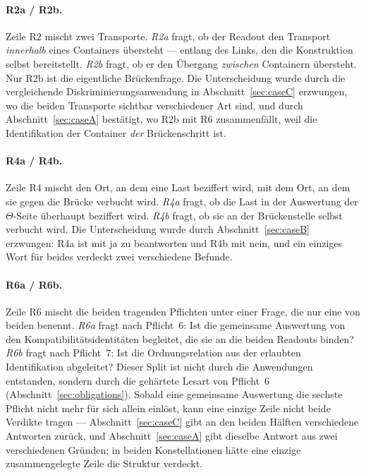 \documentclass[11pt,a4paper]{article}
\theoremstyle{definition}
\begin{document}
\paragraph{R2a / R2b.} Zeile R2 mischt zwei Transporte. \emph{R2a} fragt, ob der
Readout den Transport \emph{innerhalb} eines Containers übersteht --- entlang des
Links, den die Konstruktion selbst bereitstellt. \emph{R2b} fragt, ob er den
Übergang \emph{zwischen} Containern übersteht. Nur R2b ist die eigentliche
Brückenfrage. Die Unterscheidung wurde durch die vergleichende
Diskriminierungsanwendung in
Abschnitt~\ref{sec:caseC} erzwungen, wo die beiden Transporte sichtbar
verschiedener Art sind, und durch Abschnitt~\ref{sec:caseA} bestätigt, wo R2b mit
R6 zusammenfällt, weil die Identifikation der Container \emph{der} Brückenschritt
ist.

\paragraph{R4a / R4b.} Zeile R4 mischt den Ort, an dem eine Last beziffert wird,
mit dem Ort, an dem sie gegen die Brücke verbucht wird. \emph{R4a} fragt, ob die
Last in der Auswertung der $\Theta$-Seite überhaupt beziffert wird. \emph{R4b}
fragt, ob sie an der Brückenstelle selbst verbucht wird. Die Unterscheidung wurde
durch Abschnitt~\ref{sec:caseB} erzwungen: R4a ist mit ja zu beantworten und R4b
mit nein, und ein einziges Wort für beides verdeckt zwei verschiedene Befunde.

\paragraph{R6a / R6b.} Zeile R6 mischt die beiden tragenden Pflichten unter einer
Frage, die nur eine von beiden benennt. \emph{R6a} fragt nach Pflicht~6: Ist die
gemeinsame Auswertung von den Kompatibilitätsidentitäten begleitet, die sie an die
beiden Readouts binden? \emph{R6b} fragt nach Pflicht~7: Ist die Ordnungsrelation
aus der erlaubten Identifikation abgeleitet? Dieser Split ist nicht durch die
Anwendungen entstanden, sondern durch die gehärtete Lesart von Pflicht~6
(Abschnitt~\ref{sec:obligations}). Sobald eine gemeinsame Auswertung die sechste
Pflicht nicht mehr für sich allein einlöst, kann eine einzige Zeile nicht beide
Verdikte tragen --- Abschnitt~\ref{sec:caseC} gibt an den beiden Hälften
verschiedene Antworten zurück, und Abschnitt~\ref{sec:caseA} gibt dieselbe
Antwort aus zwei verschiedenen Gründen; in beiden Konstellationen hätte
eine einzige zusammengelegte Zeile die Struktur verdeckt.
\end{document}
